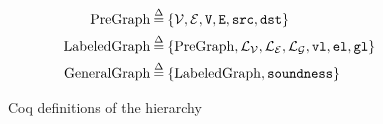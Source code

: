 \newcommand{\ma}[1]{\ensuremath{\mathcal{#1}}} %

\begin{figure}[t]
        \begin{gather*}
          \begin{aligned}
            \mathrm{PreGraph}\defeq\{&\ma{V}, \ma{E}, \mathtt{V}, \mathtt{E}, \mathtt{src}, \mathtt{dst}\} \\
            \mathrm{LabeledGraph}\defeq\{&\mathrm{PreGraph},\ma{L_{V}},\ma{L_{E}},\ma{L_{G}}, \mathtt{vl},\mathtt{el},\mathtt{gl}\} \\
            \mathrm{GeneralGraph}\defeq\{&\mathrm{LabeledGraph},
            \mathtt{soundness}\}
          \end{aligned}\\
        \end{gather*}
\caption{Coq definitions of the hierarchy}
\label{fig:coqgraphs}
\vspace{-1em}
\end{figure}